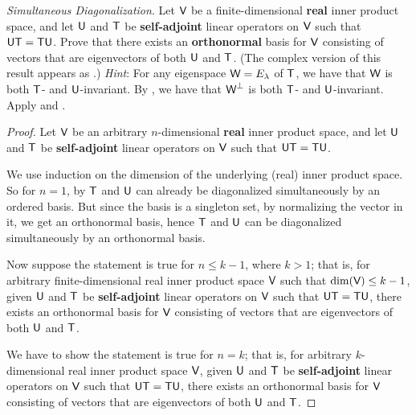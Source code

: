 \begin{exercise} \label{exercise 6.4.14}
\emph{Simultaneous Diagonalization}.
Let \(\textsf{V}\) be a finite-dimensional \textbf{real} inner product space, and let \(\textsf{U}\) and \(\textsf{T}\) be \textbf{self-adjoint} linear operators on \(\textsf{V}\) such that \(\textsf{U}\textsf{T} = \textsf{T}\textsf{U}\).
Prove that there exists an \textbf{orthonormal} basis for \(\textsf{V}\) consisting of vectors that are eigenvectors of both \(\textsf{U}\) and \(\textsf{T}\).
(The complex version of this result appears as .)
\emph{Hint}: For any eigenspace \(\textsf{W} = E_{\lambda}\) of \(\textsf{T}\), we have that \(\textsf{W}\) is both \(\textsf{T}\)- and \(\textsf{U}\)-invariant.
By , we have that \(\textsf{W}^{\perp}\) is both \(\textsf{T}\)- and \(\textsf{U}\)-invariant.
Apply  and .
\end{exercise}

\begin{proof}
Let \(\textsf{V}\) be an arbitrary \(n\)-dimensional \textbf{real} inner product space, and let \(\textsf{U}\) and \(\textsf{T}\) be \textbf{self-adjoint} linear operators on \(\textsf{V}\) such that \(\textsf{U}\textsf{T} = \textsf{T}\textsf{U}\).

We use induction on the dimension of the underlying (real) inner product space.
So for \(n = 1\), by  \(\textsf{T}\) and \(\textsf{U}\) can already be diagonalized simultaneously by an ordered basis.
But since the basis is a singleton set, by normalizing the vector in it, we get an orthonormal basis, hence \(\textsf{T}\) and \(\textsf{U}\) can be diagonalized simultaneously by an orthonormal basis.

Now suppose the statement is true for \(n \le k - 1\), where \(k > 1\);
that is, for arbitrary finite-dimensional real inner product space \(\textsf{V}\) such that \(\dim(\textsf{V}) \le k - 1\),
given \(\textsf{U}\) and \(\textsf{T}\) be \textbf{self-adjoint} linear operators on \(\textsf{V}\) such that \(\textsf{U}\textsf{T} = \textsf{T}\textsf{U}\), there exists an orthonormal basis for \(\textsf{V}\) consisting of vectors that are eigenvectors of both \(\textsf{U}\) and \(\textsf{T}\).

We have to show the statement is true for \(n = k\); that is, for arbitrary \(k\)-dimensional real inner product space \(\textsf{V}\),
given \(\textsf{U}\) and \(\textsf{T}\) be \textbf{self-adjoint} linear operators on \(\textsf{V}\) such that \(\textsf{U}\textsf{T} = \textsf{T}\textsf{U}\), there exists an orthonormal basis for \(\textsf{V}\) consisting of vectors that are eigenvectors of both \(\textsf{U}\) and \(\textsf{T}\).


\end{proof}
